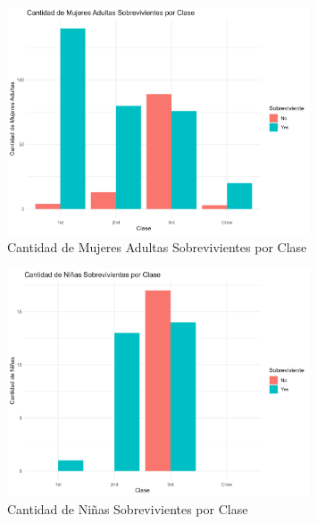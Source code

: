 \documentclass{article}
\begin{document}

\begin{figure}[H]
    \centering
    \includegraphics[width=0.8\textwidth]{mujeres_adultas_sobrevivientes_por_clase.png}
    \caption{Cantidad de Mujeres Adultas Sobrevivientes por Clase}
    \label{fig:mujeres_adultas_sobrevivientes_por_clase}
\end{figure}


\begin{figure}[H]
    \centering
    \includegraphics[width=0.8\textwidth]{ninas_sobrevivientes_por_clase.png}
    \caption{Cantidad de Niñas Sobrevivientes por Clase}
    \label{fig:ninas_sobrevivientes_por_clase}
\end{figure}

\end{document}

